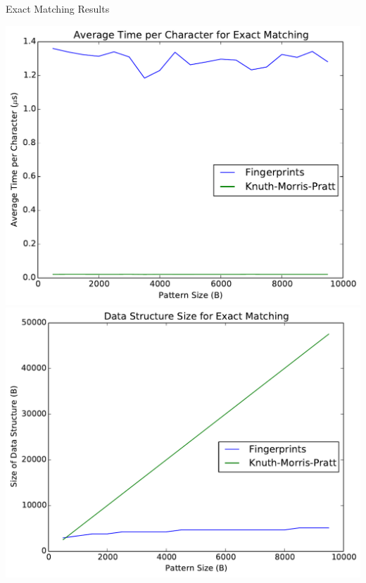 \documentclass[ %
                    author={Dominic Moylett},
                supervisor={Dr. Raphael Clifford, Dr. Markus Jalsenius and Dr. Benjamin Sach},
                     title={An Empirical Analysis of Data Streaming Algorithms},
                  subtitle={},
                    degree={MEng},
                      year={2014} ]{poster}
\begin{document}
\begin{frame}{}
\begin{columns}[t]
  \begin{column}{0.422\linewidth}
  \begin{block}{\Large Exact Matching Results}
  \begin{center}
  \includegraphics[scale=0.6]{exact_run_time}\includegraphics[scale=0.6]{exact_size}
  \end{center}
  \end{block}
  \end{column}
\end{columns}

\vfill


\end{frame}
\end{document}
